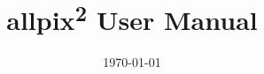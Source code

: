\documentclass{scrartcl}
\title{allpix\textsuperscript{2} User Manual} %
\author{
} %
\date{\today} %
\begin{document}
\maketitle %


\begin{abstract}
\end{abstract}

\newpage
\tableofcontents

\newpage



\clearpage
{}
{}
\begin{thebibliography}{99}
  
\end{thebibliography}  
\end{document}
